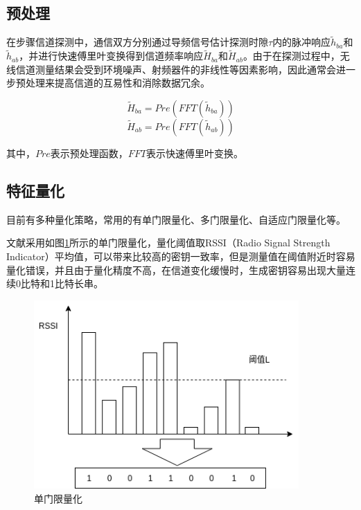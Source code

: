 \documentclass[master]{seuthesis} %
\begin{document}
\begin{Main}
\subsection{预处理}

在步骤信道探测中，通信双方分别通过导频信号估计探测时隙$\tau$内的脉冲响应$\tilde{h}_{ba}$和$\tilde{h}_{ab}$，并进行快速傅里叶变换得到信道频率响应$\tilde{H}_{ba}$和$\tilde{H}_{ab}$。由于在探测过程中，无线信道测量结果会受到环境噪声、射频器件的非线性等因素影响，因此通常会进一步预处理来提高信道的互易性和消除数据冗余。

\begin{equation}
    \tilde{H}_{ba} = Pre(FFT(\tilde{h}_{ba}))
\end{equation}
\begin{equation}
    \tilde{H}_{ab} = Pre(FFT(\tilde{h}_{ab}))
\end{equation}

其中，$Pre$表示预处理函数，$FFT$表示快速傅里叶变换。

\subsection{特征量化}

目前有多种量化策略，常用的有单门限量化、多门限量化、自适应门限量化等。

文献\citet{aono2005wireless}采用如图\ref{single_quantization}所示的单门限量化，量化阈值取RSSI（Radio Signal Strength Indicator）平均值，可以带来比较高的密钥一致率，但是测量值在阈值附近时容易量化错误，并且由于量化精度不高，在信道变化缓慢时，生成密钥容易出现大量连续0比特和1比特长串。

\begin{figure}[htbp!]
    \centering \includegraphics[width=0.9\textwidth]{images/single_quantization} 
    \caption{单门限量化}
    \label{single_quantization}
\end{figure}


\end{Main}
\end{document}
